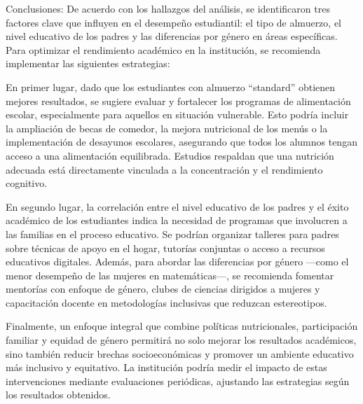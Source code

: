 \documentclass[
]{article}
\begin{document}
Conclusiones: De acuerdo con los hallazgos del análisis, se
identificaron tres factores clave que influyen en el desempeño
estudiantil: el tipo de almuerzo, el nivel educativo de los padres y las
diferencias por género en áreas específicas. Para optimizar el
rendimiento académico en la institución, se recomienda implementar las
siguientes estrategias:

En primer lugar, dado que los estudiantes con almuerzo ``standard''
obtienen mejores resultados, se sugiere evaluar y fortalecer los
programas de alimentación escolar, especialmente para aquellos en
situación vulnerable. Esto podría incluir la ampliación de becas de
comedor, la mejora nutricional de los menús o la implementación de
desayunos escolares, asegurando que todos los alumnos tengan acceso a
una alimentación equilibrada. Estudios respaldan que una nutrición
adecuada está directamente vinculada a la concentración y el rendimiento
cognitivo.

En segundo lugar, la correlación entre el nivel educativo de los padres
y el éxito académico de los estudiantes indica la necesidad de programas
que involucren a las familias en el proceso educativo. Se podrían
organizar talleres para padres sobre técnicas de apoyo en el hogar,
tutorías conjuntas o acceso a recursos educativos digitales. Además,
para abordar las diferencias por género ---como el menor desempeño de
las mujeres en matemáticas---, se recomienda fomentar mentorías con
enfoque de género, clubes de ciencias dirigidos a mujeres y capacitación
docente en metodologías inclusivas que reduzcan estereotipos.

Finalmente, un enfoque integral que combine políticas nutricionales,
participación familiar y equidad de género permitirá no solo mejorar los
resultados académicos, sino también reducir brechas socioeconómicas y
promover un ambiente educativo más inclusivo y equitativo. La
institución podría medir el impacto de estas intervenciones mediante
evaluaciones periódicas, ajustando las estrategias según los resultados
obtenidos.
\end{document}
